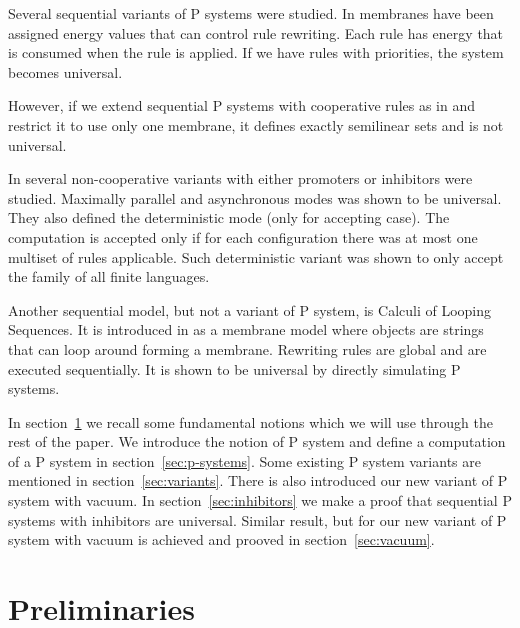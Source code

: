 \documentclass[a4paper,10pt]{article}
\begin{document}

Several sequential variants of P systems were studied. In \cite{Freund:2004:SPS:2149813.2149831} membranes have been assigned energy values that can control rule rewriting. Each rule has energy that is consumed when the rule is applied. If we have rules with priorities, the system becomes universal.


However, if we extend sequential P systems with cooperative rules as in \cite{Dang04onp} and restrict it to use only one membrane, it defines exactly semilinear sets and is not universal.


In \cite{Alhazov13} several non-cooperative variants with either promoters or inhibitors were studied. Maximally parallel and asynchronous modes was shown to be universal. They also defined the deterministic mode (only for accepting case). The computation is accepted only if for each configuration there was at most one multiset of rules applicable. Such deterministic variant was shown to only accept the family of all finite languages.


Another sequential model, but not a variant of P system, is Calculi of Looping Sequences. It is introduced in \cite{Barbuti07thecalculus} as a membrane model where objects are strings that can loop around forming a membrane. Rewriting rules are global and are executed sequentially. It is shown to be universal by directly simulating P systems.


In section~\ref{sec:preliminaries} we recall some fundamental notions which we will use through the rest of the paper.
We introduce the notion of P system and define a computation of a P system in section~\ref{sec:p-systems}.
Some existing P system variants are mentioned in section~\ref{sec:variants}. There is also introduced our new variant of P system with vacuum.
In section~\ref{sec:inhibitors} we make a proof that sequential P systems with inhibitors are universal.
Similar result, but for our new variant of P system with vacuum is achieved and prooved in section~\ref{sec:vacuum}.

\section{Preliminaries}
\label{sec:preliminaries}
\end{document}

